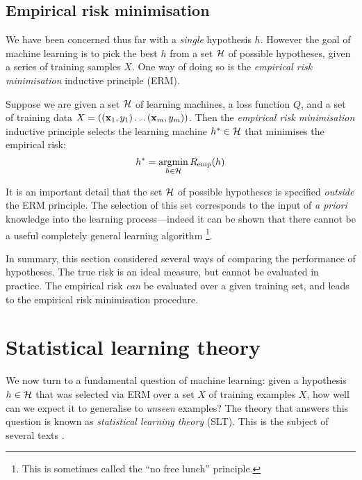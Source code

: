 \subsection{Empirical risk minimisation}
\label{sec:erm}
\label{acr:erm}

We have been concerned thus far with a \emph{single} hypothesis
$h$.  However the goal of machine learning is to pick the best
$h$ from a set $\mathcal{H}$ of possible hypotheses, given a series of
training samples $X$.  One way of doing so is the \emph{empirical risk
minimisation} inductive principle (ERM).

\begin{definition}
Suppose we are given a set $\mathcal{H}$ of learning machines, a loss
function $Q$, and a set of training data $X = ((\mathbf{x}_1, y_1) \ldots
(\mathbf{x}_m,y_m))$.  Then the \emph{empirical risk minimisation} inductive
principle selects the learning machine $h^{\ast} \in \mathcal{H}$ that
minimises the empirical risk:
%
\begin{equation}
h^{\ast} = \argmin_{h \in \calH} R_{\emp}(h)
\label{eqn:erm}
\end{equation}
\end{definition}

It is an important detail that the set $\mathcal{H}$ of possible hypotheses
is specified \emph{outside} the ERM principle.  The selection of this
set corresponds to the input of \emph{a priori} knowledge into the
learning process---indeed it can be shown that there cannot be a
useful completely general learning algorithm%
\footnote{This is sometimes called the ``no free lunch''
principle.}. 

In summary, this section considered several ways of comparing the
performance of hypotheses.  The true risk is an ideal measure, but cannot be
evaluated in practice.  The empirical risk \emph{can} be evaluated over a
given training set, and leads to the empirical risk minimisation
procedure.

\section{Statistical learning theory}
\label{sec:slt}
\label{acr:slt}

We now turn to a fundamental question of machine learning: given a
hypothesis $h \in \mathcal{H}$ that was selected via ERM over a set $X$ of
training examples $X$, how well can we expect it to generalise to 
\emph{unseen} examples?  The theory that answers this question is
known as \emph{statistical learning theory} (SLT).  This is the
subject of several texts \cite{Vapnik98, Cherkassky98, Bartlett98a}.

